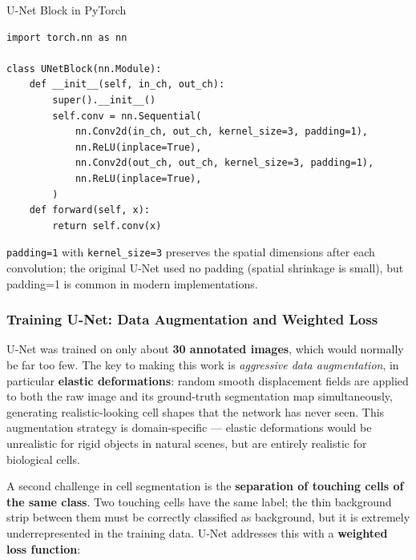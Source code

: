 \documentclass[11pt,a4paper]{article}
\newcommand{\term}[1]{\textcolor{DefGreen}{\textbf{#1}}}
\begin{document}
\begin{defbox}{U-Net Block in PyTorch}
\begin{lstlisting}[caption={One contracting block of U-Net in PyTorch}]
import torch.nn as nn

class UNetBlock(nn.Module):
    def __init__(self, in_ch, out_ch):
        super().__init__()
        self.conv = nn.Sequential(
            nn.Conv2d(in_ch, out_ch, kernel_size=3, padding=1),
            nn.ReLU(inplace=True),
            nn.Conv2d(out_ch, out_ch, kernel_size=3, padding=1),
            nn.ReLU(inplace=True),
        )
    def forward(self, x):
        return self.conv(x)
\end{lstlisting}
\texttt{padding=1} with \texttt{kernel\_size=3} preserves the spatial dimensions after each convolution; the original U-Net used no padding (spatial shrinkage is small), but padding=1 is common in modern implementations.
\end{defbox}

\subsubsection{Training U-Net: Data Augmentation and Weighted Loss}

U-Net was trained on only about \textbf{30 annotated images}, which would normally be far too few. The key to making this work is \emph{aggressive data augmentation}, in particular \term{elastic deformations}: random smooth displacement fields are applied to both the raw image and its ground-truth segmentation map simultaneously, generating realistic-looking cell shapes that the network has never seen. This augmentation strategy is domain-specific — elastic deformations would be unrealistic for rigid objects in natural scenes, but are entirely realistic for biological cells.

\medskip
A second challenge in cell segmentation is the \textbf{separation of touching cells of the same class}. Two touching cells have the same label; the thin background strip between them must be correctly classified as background, but it is extremely underrepresented in the training data. U-Net addresses this with a \term{weighted loss function}:
\end{document}
